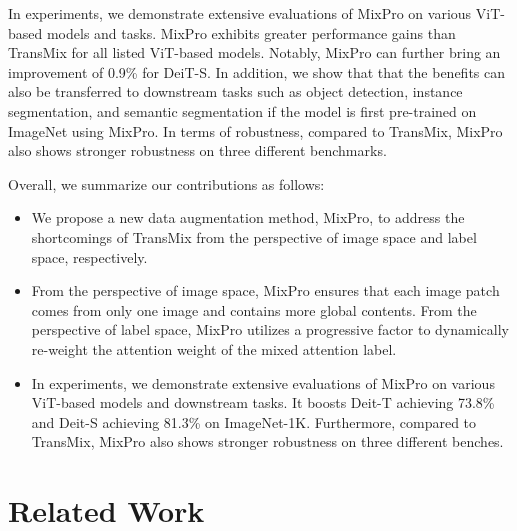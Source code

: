\documentclass{article} \usepackage{iclr2023_conference,times}
\begin{document}
In experiments, we demonstrate extensive evaluations of MixPro on various ViT-based models and tasks. MixPro exhibits greater performance gains than TransMix for all listed ViT-based models. Notably, MixPro can further bring an improvement of 0.9\% for DeiT-S. In addition, we show that that the benefits can also be transferred to downstream tasks such as object detection, instance segmentation, and semantic segmentation if the model is first pre-trained on ImageNet using MixPro.
In terms of robustness, compared to TransMix, MixPro also shows stronger robustness on three different benchmarks.

Overall, we summarize our contributions as follows:
\begin{itemize}
    \item We propose a new data augmentation method, MixPro, to address the shortcomings of TransMix from the perspective of image space and label space, respectively.
    
    \item From the perspective of image space, MixPro ensures that each image patch comes from only one image and contains more global contents. From the perspective of label space, MixPro utilizes a progressive factor to dynamically re-weight the attention weight of the mixed attention label.
    
    \item In experiments, we demonstrate extensive evaluations of MixPro on various ViT-based models and downstream tasks. It boosts Deit-T achieving 73.8\% and Deit-S achieving 81.3\% on ImageNet-1K. Furthermore, compared to TransMix, MixPro also shows stronger robustness on three different benches.
\end{itemize}


\section{Related Work}
\label{subRel}
\end{document}
